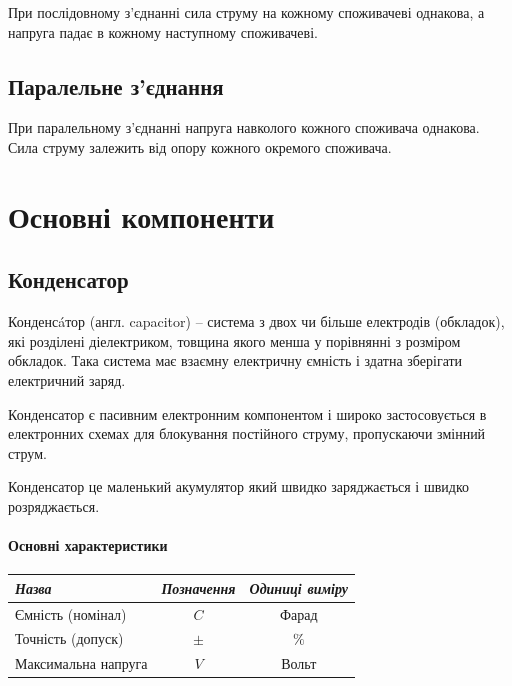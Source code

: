 \documentclass[12pt,a4paper]{book}  %
\begin{document}
При послідовному з'єднанні сила струму на кожному споживачеві однакова, а напруга падає в кожному наступному споживачеві.

\subsection{Паралельне з'єднання}

При паралельному з'єднанні напруга навколого кожного споживача однакова. Сила струму залежить від опору кожного окремого споживача.

\section{Основні компоненти}

\subsection{Конденсатор}

Конденсáтор (англ. capacitor) -- система з двох чи більше електродів (обкладок), які розділені діелектриком, товщина якого менша у порівнянні з розміром обкладок. Така система має взаємну електричну ємність і здатна зберігати електричний заряд.

Конденсатор є пасивним електронним компонентом і широко застосовується в електронних схемах для блокування постійного струму, пропускаючи змінний струм.

Конденсатор це маленький акумулятор який швидко заряджається і швидко розряджається.

\paragraph{Основні характеристики}


\begin{center}
\begin{tabular}{|l|c|c|}
\hline
\textit{Назва} & \textit{Позначення} & \textit{Одиниці виміру} \\
\hline
Ємність (номінал) & $C$ & Фарад \\
\hline
Точність (допуск) & $\pm$ & $ \% $ \\
\hline
Максимальна напруга & $V$ & Вольт \\
\hline
\end{tabular}
\end{center}
\end{document}
